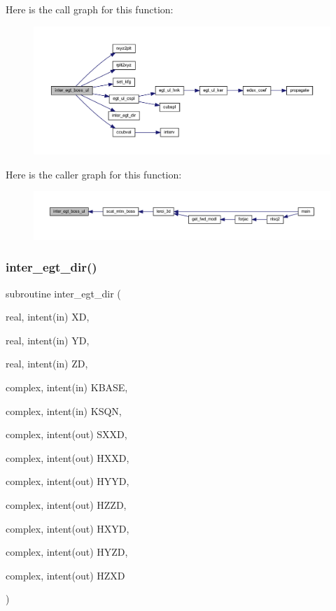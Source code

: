 Here is the call graph for this function\+:\nopagebreak
\begin{figure}[H]
\begin{center}
\leavevmode
\includegraphics[width=350pt]{Leroi_8f90_ae92f09c8cb5ab0bcf37a78e555f55025_cgraph}
\end{center}
\end{figure}
Here is the caller graph for this function\+:\nopagebreak
\begin{figure}[H]
\begin{center}
\leavevmode
\includegraphics[width=350pt]{Leroi_8f90_ae92f09c8cb5ab0bcf37a78e555f55025_icgraph}
\end{center}
\end{figure}
\mbox{\label{Leroi_8f90_ab648c76e3422d73a3d9c0530c4a77dd5}} 
\subsubsection{\texorpdfstring{inter\+\_\+egt\+\_\+dir()}{inter\_egt\_dir()}}
{\footnotesize\ttfamily subroutine inter\+\_\+egt\+\_\+dir (\begin{DoxyParamCaption}\item[{real, intent(in)}]{XD,  }\item[{real, intent(in)}]{YD,  }\item[{real, intent(in)}]{ZD,  }\item[{complex, intent(in)}]{K\+B\+A\+SE,  }\item[{complex, intent(in)}]{K\+S\+QN,  }\item[{complex, intent(out)}]{S\+X\+XD,  }\item[{complex, intent(out)}]{H\+X\+XD,  }\item[{complex, intent(out)}]{H\+Y\+YD,  }\item[{complex, intent(out)}]{H\+Z\+ZD,  }\item[{complex, intent(out)}]{H\+X\+YD,  }\item[{complex, intent(out)}]{H\+Y\+ZD,  }\item[{complex, intent(out)}]{H\+Z\+XD }\end{DoxyParamCaption})}

